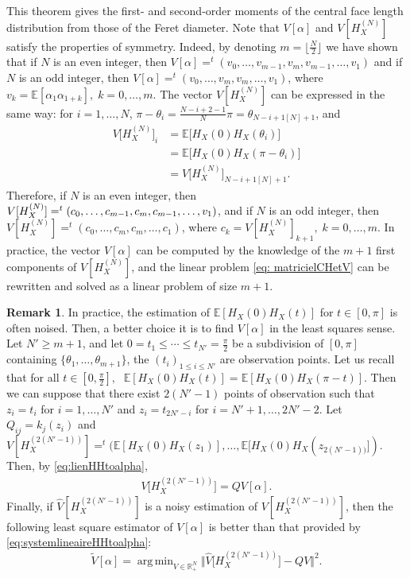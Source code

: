 \documentclass[numbers,compress,v1.0.1]{vmsta}
\DeclareMathOperator*{\argmin}{arg\,min}
\theoremstyle{definition}
\newtheorem{remark}{Remark}
\begin{document}
This theorem gives the first- and second-order moments of the central
face length distribution from those of the Feret diameter.
Note that $V[\alpha]$ and $V[H^{(N)}_{X}]$ satisfy the properties of
symmetry. Indeed, by denoting $m=\lfloor\frac{N}{2}\rfloor$ we have
shown that if $N$ is an even integer, then $V[\alpha]=^t(v_0,\dots
,v_{m-1},v_{m},v_{m-1},\dots,v_1)$ and if $N$ is an odd integer, then
$V[\alpha]=^t(v_0,\dots,v_m,v_{m},\dots, v_1)$, where $v_k=\mathbb
{E}[\alpha_1\alpha_{1+k}],\; k=0,\dots,m$. The vector $V[H^{(N)}_{X}]$
can be expressed in the same way: for $i=1,\dots,N$, $\pi-\theta
_i=\frac{N-i+2-1}{N}\pi=\theta_{N-i+1[N]+1}$, and
%
\begin{align*}
V\bigl[H^{(N)}_{X}\bigr]_{i}&=\mathbb{E}
\bigl[H_{X}(0)H_{X}(\theta_{i})\bigr]
\\
&=\mathbb{E}\bigl[H_{X}(0)H_{X}(\pi-\theta_{i})
\bigr]
\\
&=V\bigl[H^{(N)}_{X}\bigr]_{N-i+1[N]+1}.
\end{align*}
%
Therefore, if $N$ is an even integer, then $V[H^{(N)}_{X}]=^t(c_0,\dots,c_{m-1},c_{m},\break c_{m-1},\dots,v_1)$, and if $N$ is an odd integer, then
$V[H^{(N)}_{X}]=^t(c_0,\dots,c_m,c_{m},\dots,c_1)$, where
$c_k=V[H^{(N)}_{X}]_{k+1},\; k=0,\dots,m$. In practice, the vector
$V[\alpha]$ can be computed by the knowledge of the $m+1$ first
components of $V[H^{(N)}_{X}]$, and the linear problem \eqref{eq:
matricielCHetV} can be rewritten and solved as a linear problem of size $m+1$.
%
\begin{remark}
In practice, the estimation of $\mathbb{E}[ H_{X}(0) H_{X}(t)]$ for $
t\in[0,\pi]$ is often noised. Then, a better choice it is to find
$V[\alpha]$ in the least squares sense. Let $N'\geq m+1$, and let $0=
t_1\leq\cdots\leq t_{N'}=\frac{\pi}{2} $ be a subdivision of $[0,\pi
]$ containing $\lbrace\theta_1,\dots,\theta_{m+1}\rbrace$, the $(t_i)_
{1\leq i\leq{N'}}$ are observation points. Let us recall that for all
$t\in[0,\frac{\pi}{2}],\;$ $\mathbb{E}[ H_{X}(0) H_{X}(t)]=\mathbb{E}[
H_{X}(0) H_{X}(\pi-t)]$. Then we can suppose that there exist $2(N'-1)$
points of observation such that $z_i=t_i $ for $i=1,\dots,N'$ and
$z_i=t_{2N'-i} $ for $i=N'+1,\dots,2N'-2$. Let $ Q_{ij}=k_j(z_i)$ and
$V[H^{(2(N'-1))}_{X}]=^t(\mathbb{E}[ H_{X}(0) H_{X}(z_1)],\dots,\mathbb
{E}[ H_{X}(0) H_{X}(z_{2(N'-1))}])$. Then, by \eqref{eq:lienHHtoalpha},
%
\begin{align*}
V\bigl[H^{(2(N'-1))}_{X}\bigr]=QV[\alpha].
\end{align*}\eject
%
\noindent Finally, if $ \hat{V}[H^{(2(N'-1))}_{X}]$ is a noisy estimation of
$V[H^{(2(N'-1))}_{X}]$, then the following least square estimator of
$V[\alpha]$ is better than that provided by \eqref{eq:systemlineaireHHtoalpha}:
%
\begin{equation}
\tilde{V}[\alpha]=\argmin_{V\in\mathbb{R}^N_+}\bigl\Vert\hat {V}\bigl[H^{(2(N'-1))}_{X}
\bigr]-QV\bigr\Vert^2.
\end{equation}
%
\end{remark}
\end{document}
